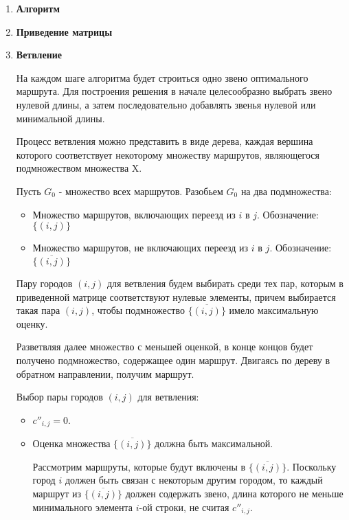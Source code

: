 \documentclass[17pt]{extarticle}
\begin{document}
\begin{enumerate}
    \item[] \textbf{Алгоритм}
    \item \textbf{Приведение матрицы}
    \item \textbf{Ветвление}

          На каждом шаге алгоритма будет строиться одно звено
          оптимального маршрута. Для построения решения в начале
          целесообразно выбрать звено нулевой длины, а затем
          последовательно добавлять звенья нулевой или минимальной длины.

          Процесс ветвления можно представить в виде
          дерева, каждая вершина которого соответствует некоторому
          множеству маршрутов, являющегося подмножеством множества X.

          Пусть \( G_0 \) - множество всех маршрутов. Разобьем \( G_0 \) на два подмножества:

          \begin{itemize}
              \item Множество маршрутов, включающих переезд из \( i \) в \( j \). Обозначение: \(\{(i, j)\}\)
              \item Множество маршрутов, не включающих переезд из \( i \) в \( j \). Обозначение: \(\{\overline{(i, j)}\}\)
          \end{itemize}

          Пару городов \((i, j)\) для ветвления будем выбирать среди тех пар, которым в приведенной матрице соответствуют нулевые элементы, причем выбирается такая пара \((i, j)\),
          чтобы подмножество \(\{\overline{(i, j)}\}\) имело максимальную оценку.

          Разветвляя далее множество с меньшей оценкой, в конце концов будет получено подмножество, содержащее один маршрут.
          Двигаясь по дереву в обратном направлении, получим маршрут.

          Выбор пары городов \((i, j)\) для ветвления:
          \begin{itemize}
              \item \( c''_{i,j} = 0 \).

              \item Оценка множества \(\{\overline{(i, j)}\}\) должна быть максимальной.

                    Рассмотрим маршруты, которые будут включены в \(\{\overline{(i, j)}\}\). Поскольку город \(i\) должен быть связан с некоторым другим городом,
                    то каждый маршрут из \(\{\overline{(i, j)}\}\) должен содержать звено,
                    длина которого не меньше минимального элемента \(i\)-ой строки, не считая \( c''_{i,j} \).


\end{itemize}
\end{enumerate}
\end{document}
